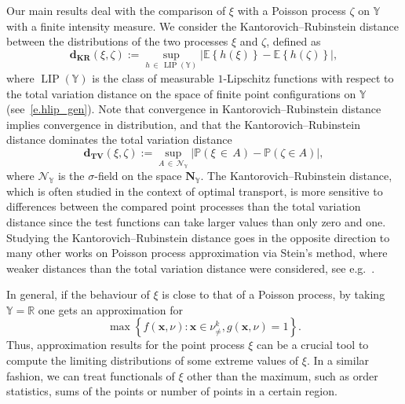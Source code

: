 \documentclass[AHL,Unicode,longabstracts]{cedram}
\DeclareMathOperator{\LIP}{LIP}
\newcommand*\bN{\mathbf{N}}
\newcommand{\bx}{\mathbf{x}}
\newcommand*\dkr{\mathbf{d_{KR}}}
\newcommand*\dTV{\mathbf{d_{TV}}}
\newcommand*\R{\mathbb{R}}
\renewcommand*\P{\mathbb{P}}
\newcommand*\Y{\mathbb{Y}}
\newcommand{\E}{\mathbb{E}}
\newcommand*\cN{\mathcal{N}}
\newcommand{\mean}[1] {\E\left\{{#1}\right\}}
\newcommand{\prob}[1]{\P\left(#1\right)}
\begin{document}
Our main results deal with the comparison of $\xi$ with a Poisson process $\zeta$ on $\Y$ with a finite intensity measure. We consider the Kantorovich--Rubinstein distance between the distributions of the two processes $\xi$ and $\zeta$, defined as
\begin{equation}\label{d:dkr}
\dkr(\xi,\zeta) {:=} \sup_{h\,\in\,\LIP(\Y)} \left|\mean{h(\xi)} - \mean{h(\zeta)}\right|,
\end{equation}
where $\LIP(\Y)$ is the class of measurable $1$-Lipschitz functions with respect to the total variation distance on the space of finite point configurations on $\Y$ (see~\eqref{e.hlip_gen}). Note that convergence in Kantorovich--Rubinstein distance implies convergence in distribution, and that the Kantorovich--Rubinstein distance dominates the total variation distance
\begin{equation}\label{d:dtv}
\dTV(\xi,\zeta) {:=} \sup_{A\,\in\,\cN_{\Y}} \left|\prob{\xi\,\in\,A} - \prob{\zeta\in A}\right|,
\end{equation}
where $\cN_{\Y}$ is the $\sigma$-field on the space $\bN_{\Y}$. The Kantorovich--Rubinstein distance, which is often studied in the context of optimal transport, is more sensitive to differences between the compared point processes than the total variation distance since the test functions can take larger values than only zero and one. Studying the Kantorovich--Rubinstein distance goes in the opposite direction to many other works on Poisson process approximation via Stein's method, where weaker distances than the total variation distance were considered, see e.g.~\cite{Barbour1992, Barbour1992book, Chen2004, Schuhmacher2005, Schuhmacher2009, Xia2005}.

In general, if the behaviour of $\xi$ is close to that of a Poisson process, by taking $\Y=\R$ one gets an approximation for
\[
\max \left\{f(\bx,\nu): \bx\in\nu^k_{\neq}, g(\bx,\nu)=1\right\}.
\]
Thus, approximation results for the point process $\xi$ can be a crucial tool to compute the limiting distributions of some extreme values of $\xi$. In a similar fashion, we can treat functionals of $\xi$ other than the maximum, such as order statistics, sums of the points or number of points in a certain region.
\end{document}
